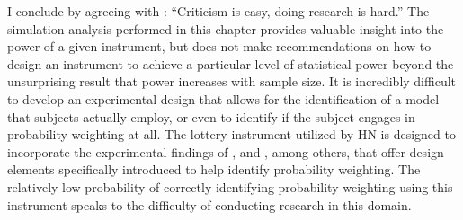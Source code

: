 \documentclass[../main.tex]{subfiles}
\begin{document}

I conclude by agreeing with \textcite[14]{Gelman2013}: \enquote{Criticism is easy, doing research is hard.}
The simulation analysis performed in this chapter provides valuable insight into the power of a given instrument, but does not make recommendations on how to design an instrument to achieve a particular level of statistical power beyond the unsurprising result that power increases with sample size.
It is incredibly difficult to develop an experimental design that allows for the identification of a model that subjects actually employ, or even to identify if the subject engages in probability weighting at all.
The lottery instrument utilized by HN \parencite*[98-99]{Harrison2016} is designed to incorporate the experimental findings of \textcite{Camerer1989}, \textcite{Harless1992} and \textcite{Loomes1998}, among others, that offer design elements specifically introduced to help identify probability weighting.
The relatively low probability of correctly identifying probability weighting using this instrument speaks to the difficulty of conducting research in this domain.

\onlyinsubfile{
\newpage
\printbibliography[segment=4, heading=subbibliography]
}
\end{document}
